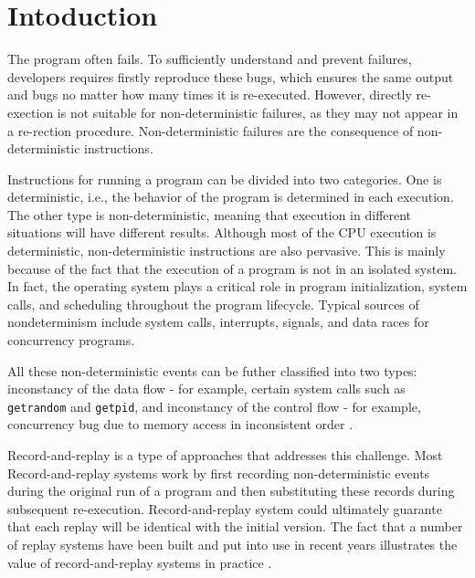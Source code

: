 \section{Intoduction}
The program often fails. To sufficiently understand and prevent failures,
developers requires firstly reproduce these bugs, which ensures the same output
and bugs no matter how many times it is re-executed. However, directly
re-exection is not suitable for non-deterministic failures, as they may not
appear in a re-rection procedure. Non-deterministic failures are the consequence
of non-deterministic instructions. 

Instructions for running a program can be divided into two categories. One is
deterministic, i.e., the behavior of the program is determined in each
execution. The other type is non-deterministic, meaning that execution in
different situations will have different results. Although most of the CPU
execution is deterministic, non-deterministic instructions are also pervasive.
This is mainly because of the fact that the execution of a program is not in an
isolated system. In fact, the operating system plays a critical role in program
initialization, system calls, and scheduling throughout the program lifecycle.
Typical sources of nondeterminism include system calls, interrupts, signals, and
data races for concurrency programs.

All these non-deterministic events can be futher classified into two types:
inconstancy of the data flow - for example, certain system calls such as
\texttt{getrandom} and \texttt{getpid}, and inconstancy of the control flow
- for example, concurrency bug due to memory access in inconsistent order \cite{getrandom2}.

Record-and-replay is a type of approaches that addresses this challenge. Most
Record-and-replay systems work by first recording non-deterministic events
during the original run of a program and then substituting these records during
subsequent re-execution. Record-and-replay system could ultimately guarante that
each replay will be identical with the initial version. The fact that a number
of replay systems have been built and put into use in recent years illustrates
the value of record-and-replay systems in practice \cite{203227,replay_survey,altekar_odr_2009,bhansali_framework_2006}.


